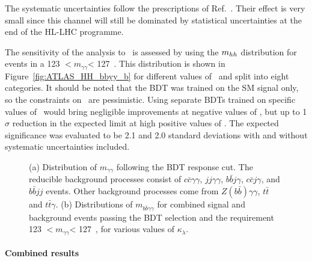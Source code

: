 The systematic uncertainties follow the prescriptions of Ref.~\cite{ATLASperfPUBnote}. Their effect is very small since this channel will still be dominated by statistical uncertainties at the end of the HL-LHC programme.


The sensitivity of the analysis to \kl\ is assessed by using the $m_{hh}$ distribution for events in a 123 $ < \ensuremath{m_{\gamma\gamma}} $< 127~\GeV. This distribution is shown in Figure~\ref{fig:ATLAS_HH_bbyy_b} for different values of \kl\ and split into eight categories. It should be noted that the BDT was trained on the SM signal only, so the constraints on \kl\ are pessimistic. Using separate BDTs trained on specific values of \kl\ would bring negligible improvements at negative values of \kl, but up to 1$\sigma$ reduction in the expected limit at high positive values of \kl.
The expected significance was evaluated to be 2.1 and 2.0 standard deviations with and without systematic uncertainties included.



\begin{figure}[!htb]
\centering 
{} 
\caption{(a) Distribution of $m_{\gamma\gamma}$ following the BDT response cut. The reducible background processes consist of $c\bar{c}\gamma\gamma$, $jj\gamma\gamma$, $b\bar{b}j\gamma$, $c\bar{c}j\gamma$, and $b\bar{b}jj$ events.  Other background processes come from $Z(b\bar{b})\gamma\gamma$, $t\bar{t}$ and $t\bar{t}\gamma$.
(b) Distributions of $m_{b\bar{b}\gamma\gamma}$ for combined signal and background events passing the BDT selection and the requirement 123 \GeV $ < \ensuremath{m_{\gamma\gamma}} $< 127~\GeV, for various values of $\kappa_{\lambda}$.} 
\label{fig:ATLAS_HH_bbyy} 
\end{figure}


%
\paragraph{Combined results}



